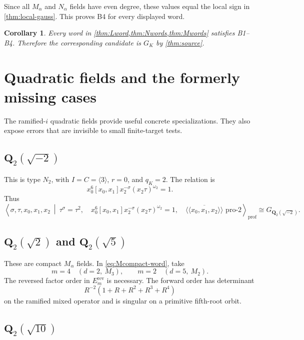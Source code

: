 \documentclass[11pt,reqno]{amsart}
\newtheorem{corollary}[theorem]{Corollary}
\theoremstyle{definition}
\theoremstyle{remark}
\numberwithin{equation}{section}
\newcommand{\Q}{\mathbf Q}
\newcommand{\prof}{\mathrm{prof}}
\begin{document}
Since all \(M_\alpha\) and \(N_\alpha\) fields have even degree, these
values equal the local sign in \cref{thm:local-gauss}.  This proves B4
for every displayed word.

\begin{corollary}\label{cor:branch-source}
Every word in \cref{thm:Lword,thm:Nwords,thm:Mwords} satisfies B1--B4.
Therefore the corresponding candidate is \(G_K\) by
\cref{thm:source}.
\end{corollary}

\section{Quadratic fields and the formerly missing cases}
\label{sec:quadratic}

The ramified-\(i\) quadratic fields provide useful concrete
specializations.  They also expose errors that are invisible to small
finite-target tests.

\subsection{\texorpdfstring{\(\Q_2(\sqrt{-2})\)}{Q2(sqrt(-2))}}

This is type \(N_2\), with \(I=C=\langle3\rangle\), \(r=0\), and
\(q_K=2\).  The relation is
\[
 x_0^6[x_0,x_1]x_2^{-\sigma}
 (x_2\tau)^{\omega_2}=1.
\]
Thus
\[
\left\langle
\sigma,\tau,x_0,x_1,x_2
\ \middle|\
\tau^\sigma=\tau^2,\quad
x_0^6[x_0,x_1]x_2^{-\sigma}(x_2\tau)^{\omega_2}=1,\quad
\overline{\langle\!\langle x_0,x_1,x_2\rangle\!\rangle}
\text{ pro-}2
\right\rangle_{\prof}
\cong G_{\Q_2(\sqrt{-2})}.
\]

\subsection{\texorpdfstring{\(\Q_2(\sqrt2)\) and
\(\Q_2(\sqrt5)\)}{Q2(sqrt(2)) and Q2(sqrt(5))}}

These are compact \(M_\alpha\) fields.  In
\eqref{eq:Mcompact-word}, take
\[
 m=4\quad(d=2,\ M_3),\qquad
 m=2\quad(d=5,\ M_2).
\]
The reversed factor order in \(E_m^{\mathrm{rev}}\) is necessary.  The
forward order has determinant
\[
 R^{-2}(1+R+R^2+R^3+R^4)
\]
on the ramified mixed operator and is singular on a primitive
fifth-root orbit.

\subsection{\texorpdfstring{\(\Q_2(\sqrt{10})\)}{Q2(sqrt(10))}}
\end{document}
